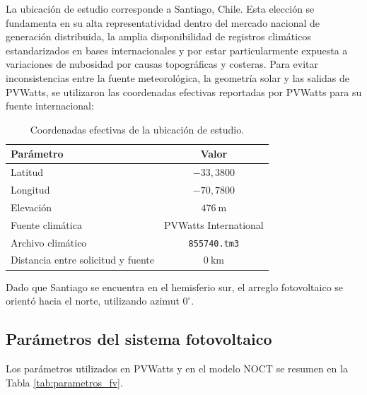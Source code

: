 \documentclass[12pt, letterpaper]{article}
\begin{document}
La ubicaci\'on de estudio corresponde a Santiago, Chile. Esta elecci\'on se fundamenta en su alta representatividad dentro del mercado nacional de generaci\'on distribuida, la amplia disponibilidad de registros clim\'aticos estandarizados en bases internacionales y por estar particularmente expuesta a variaciones de nubosidad por causas topogr\'aficas y costeras. Para evitar inconsistencias entre la fuente meteorol\'ogica, la geometr\'ia solar y las salidas de PVWatts, se utilizaron las coordenadas efectivas reportadas por PVWatts para su fuente internacional:

\begin{table}[H]
\centering
\caption{Coordenadas efectivas de la ubicaci\'on de estudio.}
\begin{tabular}{lc}
\toprule
\textbf{Par\'ametro} & \textbf{Valor} \\
\midrule
Latitud & \(-33{,}3800\) \\
Longitud & \(-70{,}7800\) \\
Elevaci\'on & \(\SI{476}{\meter}\) \\
Fuente clim\'atica & PVWatts International \\
Archivo clim\'atico & \texttt{855740.tm3} \\
Distancia entre solicitud y fuente & \(\SI{0}{\kilo\meter}\) \\
\bottomrule
\end{tabular}
\end{table}

Dado que Santiago se encuentra en el hemisferio sur, el arreglo fotovoltaico se orient\'o hacia el norte, utilizando azimut \(0^\circ\).

\subsection{Par\'ametros del sistema fotovoltaico}

Los par\'ametros utilizados en PVWatts y en el modelo NOCT se resumen en la Tabla \ref{tab:parametros_fv}.
\end{document}
